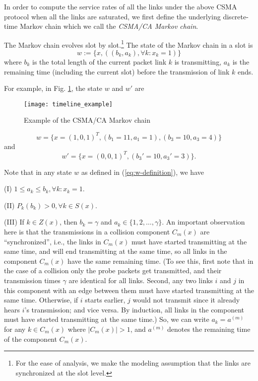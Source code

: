 \documentclass{IEEEtran}
\begin{document}
In order to compute the service rates of all the links under the above
CSMA protocol when all the links are saturated, we first define the
underlying discrete-time Markov chain which we call the \emph{CSMA/CA
Markov chain}.

The Markov chain evolves slot by slot.\footnote{For the ease of analysis, we make the modeling assumption that the
links are synchronized at the slot level.} The state of the Markov chain in a slot is \begin{equation}
w:=\{x,((b_{k},a_{k}),\forall k:x_{k}=1)\}\label{eq:w-definition}\end{equation}
where $b_{k}$ is the total length of the current packet link $k$
is transmitting, $a_{k}$ is the remaining time (including the current
slot) before the transmission of link $k$ ends. 

For example, in Fig. \ref{fig:Example-Markov}, the state $w$ and
$w'$ are\begin{figure}
\begin{centering}
\texttt{[image: timeline\_example]}
\par\end{centering}

\caption{\label{fig:Example-Markov}Example of the CSMA/CA Markov chain}

\end{figure}
\begin{equation}
w=\{x=(1,0,1)^{T},(b_{1}=11,a_{1}=1),(b_{3}=10,a_{3}=4)\}\label{eq:w-example}\end{equation}
and\begin{equation}
w'=\{x=(0,0,1)^{T},(b_{3}'=10,a_{3}'=3)\}.\label{eq:wp-example}\end{equation}


Note that in any state $w$ as defined in (\ref{eq:w-definition}),
we have

(I) $1\le a_{k}\le b_{k},\forall k:x_{k}=1$. 

(II) $P_{k}(b_{k})>0,\forall k\in S(x)$.

(III) If $k\in Z(x)$, then $b_{k}=\gamma$ and $a_{k}\in\{1,2,\dots,\gamma\}$.
An important observation here is that the transmissions in a collision
component $C_{m}(x)$ are {}``synchronized'', i.e., the links in
$C_{m}(x)$ must have started transmitting at the same time, and will
end transmitting at the same time, so all links in the component $C_{m}(x)$
have the same remaining time. (To see this, first note that in the
case of a collision only the probe packets get transmitted, and their
transmission times $\gamma$ are identical for all links. Second,
any two links $i$ and $j$ in this component with an edge between
them must have started transmitting at the same time. Otherwise, if
$i$ starts earlier, $j$ would not transmit since it already hears
$i$'s transmission; and vice versa. By induction, all links in the
component must have started transmitting at the same time.) So, we
can write $a_{k}=a^{(m)}$ for any $k\in C_{m}(x)$ where $|C_{m}(x)|>1$,
and $a^{(m)}$ denotes the remaining time of the component $C_{m}(x)$. 
\end{document}
